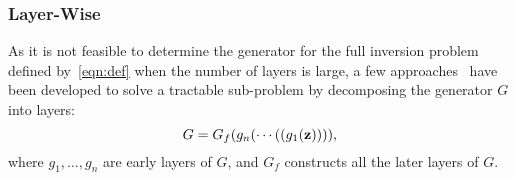 \figindomain

\subsubsection{Layer-Wise}
\label{sec:layerwise}

As it is not feasible to determine the generator for the full inversion problem defined by~\eqref{eqn:def} when the number of layers is large, a few approaches~\cite{bau2019seeing,lei2019inverting,aberdam2020invert} have been developed to solve a tractable sub-problem by decomposing the generator $G$ into layers:
\begin{equation}
G=G_{f}(g_{n}(\cdots((g_{1}(\mathbf{z})))),
\end{equation}
where $g_{1}, \ldots, g_{n}$ are early layers of $G$, and $G_{f}$ constructs all the later layers of $G$.

